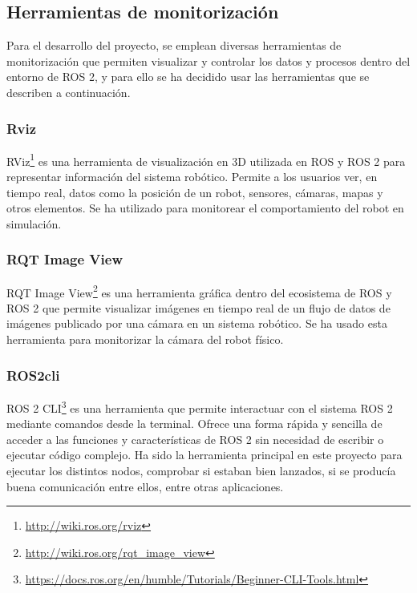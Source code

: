 \subsection{Herramientas de monitorización}
\label{subsec:monitorización}

Para el desarrollo del proyecto, se emplean diversas herramientas de monitorización que permiten visualizar y controlar los datos y procesos dentro del entorno de ROS 2, y para ello se ha decidido usar las herramientas que se describen a continuación.

\subsubsection{Rviz}
\label{subsubsec:rviz}

RViz\footnote{\url{http://wiki.ros.org/rviz}} es una herramienta de visualización en 3D utilizada en ROS y ROS 2 para representar información del sistema robótico. Permite a los usuarios ver, en tiempo real, datos como la posición de un robot, sensores, cámaras, mapas y otros elementos. Se ha utilizado para monitorear el comportamiento del robot en simulación.



\subsubsection{RQT Image View}
\label{subsubsec:rqtimage}

RQT Image View\footnote{\url{http://wiki.ros.org/rqt_image_view}} es una herramienta gráfica dentro del ecosistema de ROS y ROS 2 que permite visualizar imágenes en tiempo real de un flujo de datos de imágenes publicado por una cámara en un sistema robótico. Se ha usado esta herramienta para monitorizar la cámara del robot físico.

\subsubsection{ROS2cli}
\label{subsubsec:ros2cli}

ROS 2 \ac{CLI}\footnote{\url{https://docs.ros.org/en/humble/Tutorials/Beginner-CLI-Tools.html}} es una herramienta que permite interactuar con el sistema ROS 2 mediante comandos desde la terminal. Ofrece una forma rápida y sencilla de acceder a las funciones y características de ROS 2 sin necesidad de escribir o ejecutar código complejo. Ha sido la herramienta principal en este proyecto para ejecutar los distintos nodos, comprobar si estaban bien lanzados, si se producía buena comunicación entre ellos, entre otras aplicaciones.


